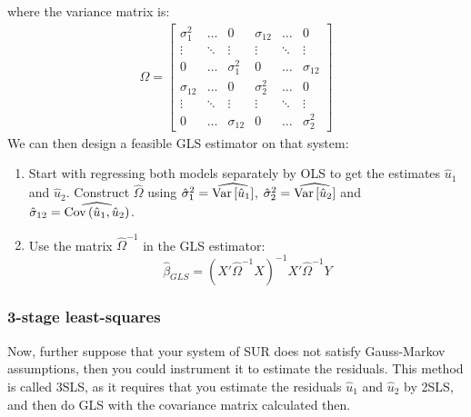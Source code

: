 where the variance matrix is:\begin{align*}
\Omega = 
\begin{bmatrix}
\sigma_{1}^2 & \hdots & 0 & \sigma_{12} & \hdots & 0 \\
\vdots	& \ddots & \vdots & \vdots & \ddots & \vdots \\
0 & \hdots & \sigma_1^2 & 0 & \hdots & \sigma_{12} \\
\sigma_{12} & \hdots & 0 & \sigma_{2}^{2} & \hdots & 0 \\
\vdots	& \ddots & \vdots & \vdots & \ddots & \vdots \\
0 & \hdots & \sigma_{12} & 0 & \hdots & \sigma_{2}^2
\end{bmatrix}
\end{align*}
We can then design a feasible GLS estimator on that system:\begin{enumerate}
\item Start with regressing both models separately by OLS to get the estimates $\hat u_1$ and $\hat u_2$. Construct $\hat\Omega $ using $\hat \sigma_1^2 = \widehat{\operatorname{Var}\left[\hat u_1\right]}$, $\hat \sigma_2^2 = \widehat{\operatorname{Var}\left[\hat u_2\right]}$ and $\hat \sigma_{12} = \widehat{\operatorname{Cov}\left(\hat u_1, \hat u_2\right)}$.
\item Use the matrix $\hat\Omega^{-1}$ in the GLS estimator: $$\hat \beta_{GLS} = (X'\hat\Omega^{-1}X)^{-1}X'\hat\Omega^{-1}Y$$
\end{enumerate}

\subsubsection{3-stage least-squares}

Now, further suppose that your system of SUR does not satisfy Gauss-Markov assumptions, then you could instrument it to estimate the residuals. This method is called 3SLS, as it requires that you estimate the residuals $\hat u_1$ and $\hat u_2$ by 2SLS, and then do GLS with the covariance matrix calculated then.